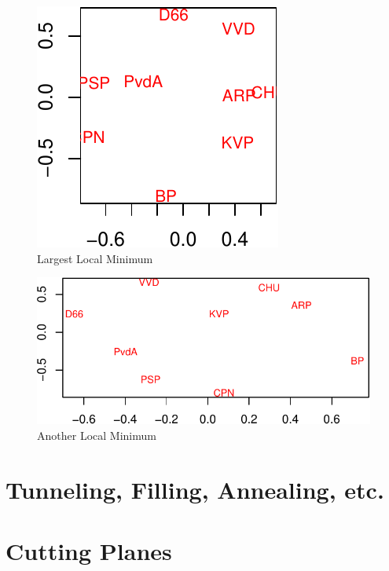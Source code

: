 \documentclass[
  12pt,
  letterpaper,
  DIV=11,
  numbers=noendperiod]{scrreprt}
\theoremstyle{remark}
\begin{document}
\begin{figure}[H]

{\centering \includegraphics{global_files/figure-pdf/gruijterlmplot1-1.pdf}

}

\caption{Largest Local Minimum}

\end{figure}%

\begin{figure}[H]

{\centering \includegraphics{global_files/figure-pdf/gruijterlmplot2-1.pdf}

}

\caption{Another Local Minimum}

\end{figure}%

\section{Tunneling, Filling, Annealing,
etc.}\label{tunneling-filling-annealing-etc.}

\section{Cutting Planes}\label{globcutplanes}
\end{document}
